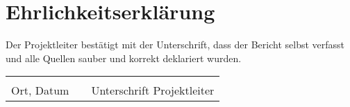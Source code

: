 \section{Ehrlichkeitserkl\"arung}
Der Projektleiter bestätigt mit der Unterschrift, dass der Bericht selbst verfasst und alle Quellen sauber und korrekt deklariert wurden.\\



\begin{tabular}{lp{20em}l}
 \hspace{3cm}   && \hspace{3cm} \\\cline{1-1}\cline{3-3}
 Ort, Datum     && Unterschrift Projektleiter
\end{tabular}

\newpage